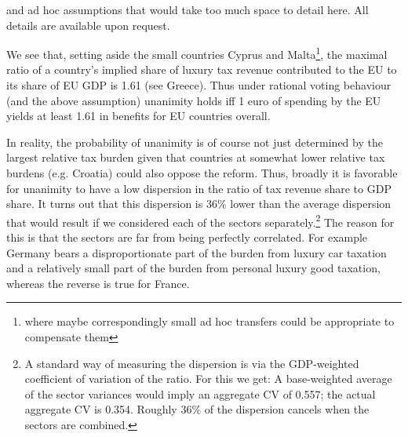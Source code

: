 \documentclass{article}
\begin{document}
\begin{table}[htbp]
{and ad hoc assumptions that would take too much space to detail here. All details are available upon request.
}

\label{tab:countryalloc}
\end{table}

We see that, setting aside the small countries Cyprus and Malta\footnote{where maybe correspondingly small ad hoc transfers could be appropriate to compensate them}, %
the maximal ratio of a country's implied share of luxury tax revenue contributed to the EU to its share of EU GDP is 1.61 (see Greece). Thus under rational voting behaviour (and the above assumption) unanimity holds iff 1 euro of spending by the EU yields at least 1.61 in benefits for EU countries overall.

In reality, the probability of unanimity is of course not just determined by the largest relative tax burden given that countries at somewhat lower relative tax burdens (e.g. Croatia) could also oppose the reform. Thus, broadly it is favorable for unanimity to have a low dispersion in the ratio of tax revenue share to GDP share. It turns out that this dispersion is 36\% lower than the average dispersion that would result if we considered each of the sectors separately.\footnote{A standard way of measuring the dispersion is via the GDP-weighted coefficient of variation of the ratio. For this we get: A base-weighted average of the sector variances would imply an aggregate CV of 0.557; the actual aggregate CV is 0.354. Roughly 36\% of the dispersion cancels when the sectors are combined. } The reason for this is that the sectors are far from being perfectly correlated. For example Germany bears a disproportionate part of the burden from luxury car taxation and a relatively small part of the burden from personal luxury good taxation, whereas the reverse is true for France. 


\end{document}
